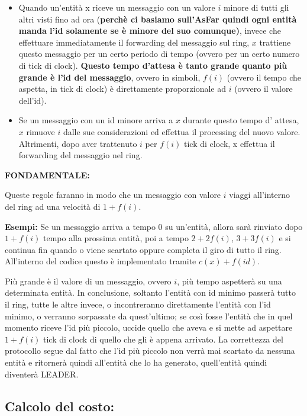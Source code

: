 \begin{itemize}
    \item Quando un'entità x riceve un messaggio con un valore $i$ minore di tutti gli altri visti fino ad ora (\textbf{perchè ci basiamo sull'AsFar quindi ogni entità manda l'id solamente se è minore del suo comunque)}, invece che effettuare immediatamente il forwarding del messaggio sul ring, $x$ trattiene questo messaggio per un certo periodo di tempo (ovvero per un certo numero di tick di clock). \textbf{Questo tempo d'attesa è tanto grande quanto più grande è l'id del messaggio}, ovvero in simboli, $f(i)$ (ovvero il tempo che aspetta, in tick di clock) è direttamente proporzionale ad $i$ (ovvero il valore dell'id).
    \item Se un messaggio con un id minore arriva a $x$ durante questo tempo d' attesa, $x$ rimuove $i$ dalle sue considerazioni ed effettua il processing del nuovo valore. Altrimenti, dopo aver trattenuto $i$ per $f(i)$ tick di clock, x effettua il forwarding del messaggio nel ring.
\end{itemize}

\textbf{FONDAMENTALE:}\\
\begin{center}
    Queste regole faranno in modo che un messaggio con valore $i$ viaggi all'interno del ring ad una velocità di $1+f(i)$.
\end{center}

\textbf{Esempi:} Se un messaggio arriva a tempo $0$ su un'entità, allora sarà rinviato dopo $1+f(i)$ tempo alla prossima entità, poi a tempo $2+2f(i)$, $3+3f(i)$ e si continua fin quando o viene scartato oppure completa il giro di tutto il ring. All'interno del codice questo è implementato tramite $c(x)+f(id).$

Più grande è il valore di un messaggio, ovvero $i$, più tempo aspetterà su una determinata entità. In conclusione, soltanto l'entità con id minimo passerà tutto il ring, tutte le altre invece, o incontreranno direttamente l'entità con l'id minimo, o verranno sorpassate da quest'ultimo; se così fosse l'entità che in quel momento riceve l'id più piccolo, uccide quello che aveva e si mette ad aspettare $1+f(i)$ tick di clock di quello che gli è appena arrivato. La correttezza del protocollo segue dal fatto che l'id più piccolo non verrà mai scartato da nessuna entità e ritornerà quindi all'entità che lo ha generato, quell'entità quindi diventerà LEADER.

\subsection{Calcolo del costo:}
